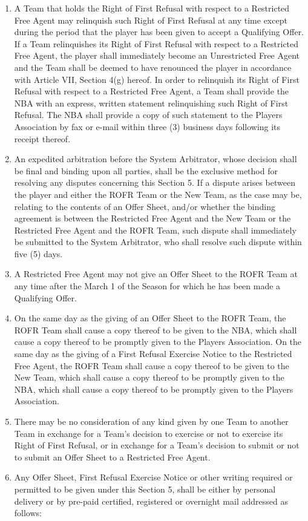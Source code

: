 \documentclass[
]{book}
\begin{document}
\begin{enumerate}
\item
  A Team that holds the Right of First Refusal with respect to a Restricted Free Agent may relinquish such Right of First Refusal at any time except during the period that the player has been given to accept a Qualifying Offer. If a Team relinquishes its Right of First Refusal with respect to a Restricted Free Agent, the player shall immediately become an Unrestricted Free Agent and the Team shall be deemed to have renounced the player in accordance with Article VII, Section 4(g) hereof. In order to relinquish its Right of First Refusal with respect to a Restricted Free Agent, a Team shall provide the NBA with an express, written statement relinquishing such Right of First Refusal. The NBA shall provide a copy of such statement to the Players Association by fax or e-mail within three (3) business days following its receipt thereof.
\item
  An expedited arbitration before the System Arbitrator, whose decision shall be final and binding upon all parties, shall be the exclusive method for resolving any disputes concerning this Section 5. If a dispute arises between the player and either the ROFR Team or the New Team, as the case may be, relating to the contents of an Offer Sheet, and/or whether the binding agreement is between the Restricted Free Agent and the New Team or the Restricted Free Agent and the ROFR Team, such dispute shall immediately be submitted to the System Arbitrator, who shall resolve such dispute within five (5) days.
\item
  A Restricted Free Agent may not give an Offer Sheet to the ROFR Team at any time after the March 1 of the Season for which he has been made a Qualifying Offer.
\item
  On the same day as the giving of an Offer Sheet to the ROFR Team, the ROFR Team shall cause a copy thereof to be given to the NBA, which shall cause a copy thereof to be promptly given to the Players Association. On the same day as the giving of a First Refusal Exercise Notice to the Restricted Free Agent, the ROFR Team shall cause a copy thereof to be given to the New Team, which shall cause a copy thereof to be promptly given to the NBA, which shall cause a copy thereof to be promptly given to the Players Association.
\item
  There may be no consideration of any kind given by one Team to another Team in exchange for a Team's decision to exercise or not to exercise its Right of First Refusal, or in exchange for a Team's decision to submit or not to submit an Offer Sheet to a Restricted Free
  Agent.
\item
  Any Offer Sheet, First Refusal Exercise Notice or other writing required or permitted to be given under this Section 5, shall be either by personal delivery or by pre-paid certified, registered or overnight mail addressed as follows:


\end{enumerate}
\end{document}
